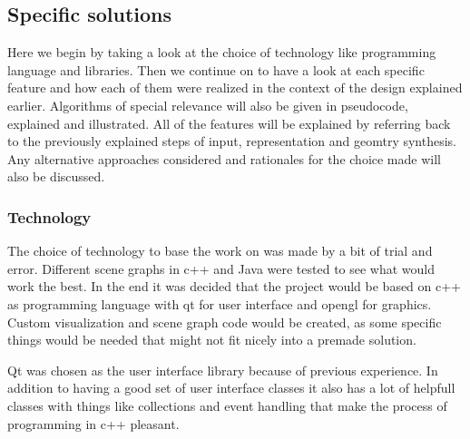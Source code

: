\documentclass[a4paper,12pt]{article}
\begin{document}
\subsection{Specific solutions}
\label{subsec:indepth}

Here we begin by taking a look at the choice of technology like programming language and libraries. Then we continue on to have a look at each specific feature and how each of them were realized in the context of the design explained earlier. Algorithms of special relevance will also be given in pseudocode, explained and illustrated. All of the features will be explained by referring back to the previously explained steps of input, representation and geomtry synthesis. Any alternative approaches considered and rationales for the choice made will also be discussed.

\subsubsection{Technology}
The choice of technology to base the work on was made by a bit of trial and error. Different scene graphs in c++ and Java were tested to see what would work the best. In the end it was decided that the project would be based on c++ as programming language with qt for user interface and opengl for graphics. Custom visualization and scene graph code would be created, as some specific things would be needed that might not fit nicely into a premade solution. 

Qt was chosen as the user interface library because of previous experience. In addition to having a good set of user interface classes it also has a lot of helpfull classes with things like collections and event handling that make the process of programming in c++ pleasant.
\end{document}
